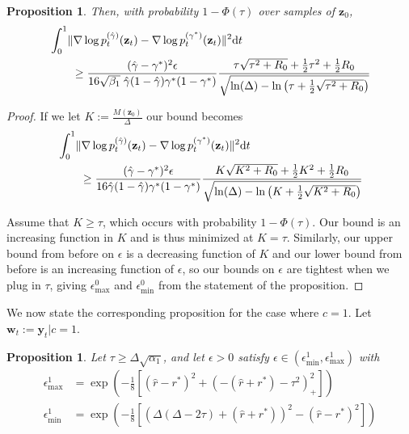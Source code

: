 \documentclass[11pt]{article}
\newcommand{\fitparenth}[1]{\left(#1\right)}
\newcommand{\fitbracket}[1]{\left[#1\right]}
\newcommand{\vect}[1]{\mathbf{#1}}
\theoremstyle{plain}
\newtheorem{proposition}[theorem]{Proposition}
\newcommand{\1}{\mathbbm{1}}
\DeclarePairedDelimiter{\norm}{\lVert}{\rVert}
\newcommand{\pdist}[2][]{p_{#1}^{(#2)}}
\newcommand{\separation}{\Delta}
\begin{document}
\begin{appendices}
\begin{proposition}
    Then, with probability $1-\Phi(\tau)$ over samples of $\vect z_0$, 
    \begin{align*}
        &\int_0^1\norm{\nabla \log \pdist[t]{\hat \gamma}(\vect z_t) - \nabla \log \pdist[t]{\gamma^{*}}(\vect z_t)}^2 \mathrm{d}t
        \\
        &\quad\quad\geq\frac{(\hat \gamma-\gamma^*)^2 \epsilon}{16\sqrt{\beta_1}\; \hat \gamma (1-\hat \gamma) \gamma^* (1-\gamma^*)} 
        \frac{\tau\sqrt{\tau^2 + R_0}+\frac{1}{2}\tau^2 + \frac{1}{2}R_0}{\sqrt{\ln(\separation)- \ln\fitparenth{\tau+ \frac{1}{2}\sqrt{\tau^2 + R_0}}}}
    \end{align*}
\end{proposition}

\begin{proof}
If we let $K:= \frac{M(\vect z_0)}{\separation}$ our bound becomes 
\begin{align*}
    &\int_0^1\norm{\nabla \log \pdist[t]{\hat \gamma}(\vect z_t) - \nabla \log \pdist[t]{\gamma^{*}}(\vect z_t)}^2 \mathrm{d}t
    \\
    &\quad\quad\geq\frac{(\hat\gamma-\gamma^*)^2 \epsilon}{16 \hat\gamma (1-\hat\gamma) \gamma^* (1-\gamma^*)} 
    \frac{K\sqrt{K^2 + R_0}+\frac{1}{2}K^2 + \frac{1}{2}R_0}{\sqrt{\ln(\separation)- \ln\fitparenth{K+ \frac{1}{2}\sqrt{K^2 + R_0}}}}
\end{align*}

Assume that $K\geq \tau$, which occurs with probability $1-\Phi(\tau)$.
Our bound is an increasing function in $K$ and is thus minimized at $K=\tau$. Similarly, our upper bound from before on $\epsilon$ is a decreasing function of $K$ and our lower bound from before is an increasing function of $\epsilon$, so our bounds on $\epsilon$ are tightest when we plug in $\tau$, giving $\epsilon_{\mathrm{max}}^0$ and $\epsilon_{\mathrm{min}}^0$ from the statement of the proposition.
\end{proof}

We now state the corresponding proposition for the case where $c=1$. Let $\vect w_t := \vect y_t |c=1$.
\begin{proposition}\label{prop:c1_lowerbound}
    Let $\tau\geq \separation \sqrt{\alpha_1}$, and let $\epsilon>0$ satisfy $ \epsilon \in (\epsilon_{\mathrm{min}}^1, \epsilon_{\mathrm{max}}^1)$ with 
    \begin{align*}
    \epsilon_{\mathrm{max}} ^1& =\exp\fitparenth{-\frac{1}{8}\fitbracket{(\hat r-r^*)^2 + \fitparenth{-(\hat r+r^*)-\tau^2}_+^2}}
    \\
    \epsilon_{\mathrm{min}}^1 &= \exp\fitparenth{-\frac{1}{8}\fitbracket{(\separation(\separation - 2\tau)+(\hat r+r^*))^2 - (\hat r-r^*)^2}}
    \end{align*}
    

\end{proposition}
\end{appendices}
\end{document}
